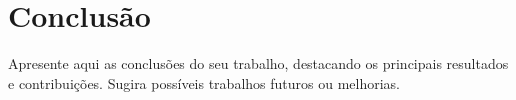 \chapter{Conclusão}
\label{cap:conclusao}

Apresente aqui as conclusões do seu trabalho, destacando os principais resultados e contribuições. Sugira possíveis trabalhos futuros ou melhorias.